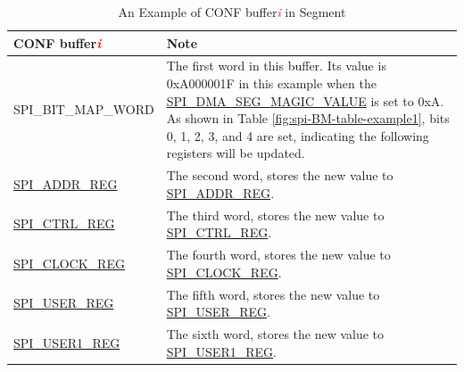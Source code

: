 \documentclass[main\_\_EN.tex]{subfiles}
\begin{document}
\begin{longtable}[c]{|L{3.5cm}|p{10cm}| }
\caption{An Example of CONF buffer\textcolor{red}{\it i} in Segment}
\label{fig:spi-BM-table-example2}\\\hline
{}
     \textbf{CONF buffer\textcolor{red}{\it i}} & \textbf{Note} \\\hline
     SPI\_BIT\_MAP\_WORD & The first word in this buffer. Its value is 0x{}A000001F in this example when the \hyperref[fielddesc:SPIDMASEGMAGICVALUE]{SPI\_DMA\_SEG\_MAGIC\_VALUE} is set to 0x{}A. As shown in Table \ref{fig:spi-BM-table-example1}, bits 0, 1, 2, 3, and 4 are set, indicating the following registers will be updated. \\\hline

     \hyperref[regdesc:SPIADDRREG]{SPI\_ADDR\_REG} & The second word, stores the new value to \hyperref[regdesc:SPIADDRREG]{SPI\_ADDR\_REG}.
     \\\hline
     \hyperref[regdesc:SPICTRLREG]{SPI\_CTRL\_REG} & The third word, stores the new value to \hyperref[regdesc:SPICTRLREG]{SPI\_CTRL\_REG}.
     \\\hline
     \hyperref[regdesc:SPICLOCKREG]{SPI\_CLOCK\_REG} & The fourth word, stores the new value to \hyperref[regdesc:SPICLOCKREG]{SPI\_CLOCK\_REG}.
     \\\hline
     \hyperref[regdesc:SPIUSERREG]{SPI\_USER\_REG} & The    fifth word, stores the new value to \hyperref[regdesc:SPIUSERREG]{SPI\_USER\_REG}.
     \\\hline
     \hyperref[regdesc:SPIUSER1REG]{SPI\_USER1\_REG}  & The sixth word, stores the new value to \hyperref[regdesc:SPIUSER1REG]{SPI\_USER1\_REG}.
     \\\hline
\end{longtable}
\end{document}
